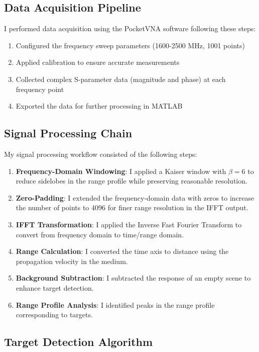 \documentclass[11pt,a4paper]{article}
\begin{document}
\subsection{Data Acquisition Pipeline}

I performed data acquisition using the PocketVNA software following these steps:

\begin{enumerate}
    \item Configured the frequency sweep parameters (1600-2500 MHz, 1001 points)
    \item Applied calibration to ensure accurate measurements
    \item Collected complex S-parameter data (magnitude and phase) at each frequency point
    \item Exported the data for further processing in MATLAB
\end{enumerate}

\subsection{Signal Processing Chain}

My signal processing workflow consisted of the following steps:

\begin{enumerate}
    \item \textbf{Frequency-Domain Windowing}: I applied a Kaiser window with $\beta = 6$ to reduce sidelobes in the range profile while preserving reasonable resolution.
    \item \textbf{Zero-Padding}: I extended the frequency-domain data with zeros to increase the number of points to 4096 for finer range resolution in the IFFT output.
    \item \textbf{IFFT Transformation}: I applied the Inverse Fast Fourier Transform to convert from frequency domain to time/range domain.
    \item \textbf{Range Calculation}: I converted the time axis to distance using the propagation velocity in the medium.
    \item \textbf{Background Subtraction}: I subtracted the response of an empty scene to enhance target detection.
    \item \textbf{Range Profile Analysis}: I identified peaks in the range profile corresponding to targets.
\end{enumerate}

\subsection{Target Detection Algorithm}
\end{document}
